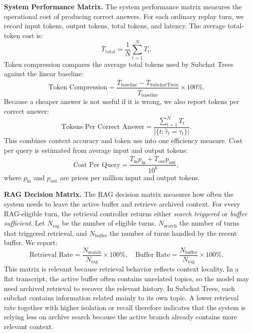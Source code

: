 \textbf{System Performance Matrix.}
The system performance matrix measures the operational cost of producing correct answers. For each ordinary replay turn, we record input tokens, output tokens, total tokens, and latency. The average total-token cost is:
\begin{equation}
\overline{T}_{\text{total}} = \frac{1}{N}\sum_{t=1}^{N} T_t.
\label{eq:avg_tokens}
\end{equation}
Token compression compares the average total tokens used by Subchat Trees against the linear baseline:
\begin{equation}
\text{Token Compression} = \frac{\overline{T}_{\text{baseline}}-\overline{T}_{\text{SubchatTrees}}}{\overline{T}_{\text{baseline}}}\times100\%.
\label{eq:compression}
\end{equation}
Because a cheaper answer is not useful if it is wrong, we also report tokens per correct answer:
\begin{equation}
\text{Tokens Per Correct Answer} = \frac{\sum_{t=1}^{N} T_t}{|\{t:\hat{\tau}_t=\tau_t\}|}.
\label{eq:tpca}
\end{equation}
This combines context accuracy and token use into one efficiency measure. Cost per query is estimated from average input and output tokens:
\begin{equation}
\text{Cost Per Query} = \frac{\overline{T}_{\text{in}}p_{\text{in}}+\overline{T}_{\text{out}}p_{\text{out}}}{10^6},
\label{eq:cost}
\end{equation}
where $p_{\text{in}}$ and $p_{\text{out}}$ are prices per million input and output tokens.

\textbf{RAG Decision Matrix.}
The RAG decision matrix measures how often the system needs to leave the active buffer and retrieve archived context. For every RAG-eligible turn, the retrieval controller returns either \textit{search triggered} or \textit{buffer sufficient}. Let $N_{\text{rag}}$ be the number of eligible turns, $N_{\text{search}}$ the number of turns that triggered retrieval, and $N_{\text{buffer}}$ the number of turns handled by the recent buffer. We report:
\begin{equation}
\text{Retrieval Rate} = \frac{N_{\text{search}}}{N_{\text{rag}}}\times100\%, \quad
\text{Buffer Rate} = \frac{N_{\text{buffer}}}{N_{\text{rag}}}\times100\%.
\label{eq:rag_rates}
\end{equation}
This matrix is relevant because retrieval behavior reflects context locality. In a flat transcript, the active buffer often contains unrelated topics, so the model may need archived retrieval to recover the relevant history. In Subchat Trees, each subchat contains information related mainly to its own topic. A lower retrieval rate together with higher isolation or recall therefore indicates that the system is relying less on archive search because the active branch already contains more relevant context.

